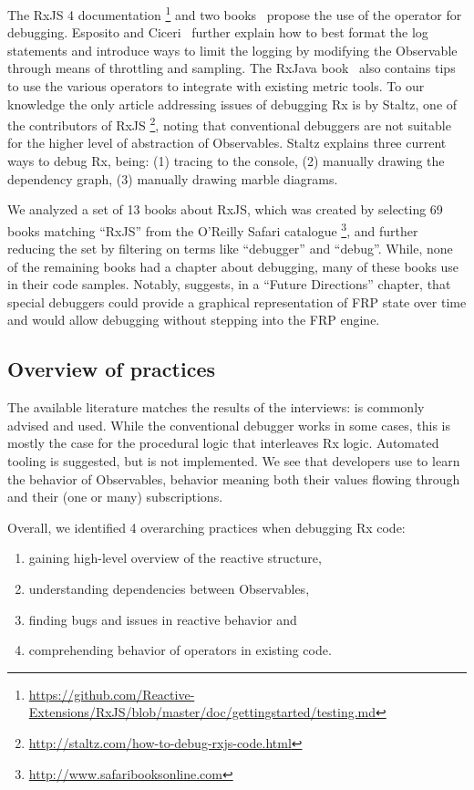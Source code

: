 The RxJS 4 documentation%
\footnote{ \url{https://github.com/Reactive-Extensions/RxJS/blob/master/doc/gettingstarted/testing.md}
} and two books~\cite{esposito2016reactive,rxjavabook2016} propose the
use of the  operator for debugging.  Esposito and Ciceri~\cite{esposito2016reactive}
further explain how to best format the log statements and introduce ways
to limit the logging by modifying the Observable through means of
throttling and sampling.  The RxJava book~\cite{rxjavabook2016} also
contains tips to use the various  operators to integrate with
existing metric tools.  To our knowledge the only article addressing
issues of debugging Rx is by Staltz, one of the contributors of RxJS%
\footnote{\url{http://staltz.com/how-to-debug-rxjs-code.html}}, noting
that conventional debuggers are not suitable for the higher level of
abstraction of Observables.  Staltz explains three current ways to debug
Rx, being:  (1) tracing to the console, (2) manually drawing the
dependency graph, (3) manually drawing marble diagrams.

We analyzed a set of 13 books about RxJS, which was created by selecting
69 books matching ``RxJS'' from the O'Reilly Safari catalogue%
\footnote{\url{http://www.safaribooksonline.com}}, and further reducing
the set by filtering on terms like ``debugger'' and ``debug''.  While,
none of the remaining books had a chapter about debugging, many of these
books use \printfdebugging{} in their code samples.  Notably,\cite{frpbook2016}
suggests, in a ``Future Directions'' chapter, that special debuggers
could provide a graphical representation of FRP state over time and
would allow debugging without stepping into the FRP engine.

\subsection{Overview of practices} The available literature matches the
results of the interviews:  \printfdebugging{} is commonly advised and
used.  While the conventional debugger works in some cases, this is
mostly the case for the procedural logic that interleaves Rx logic.
Automated tooling is suggested, but is not implemented.  We see that
developers use \printfdebugging{} to learn the behavior of Observables,
behavior meaning both their values flowing through and their (one or
many) subscriptions.

Overall, we identified 4 overarching practices when debugging Rx code:
\begin{enumerate}
        \itemsep0em
    \item[(1)]
        gaining high-level overview of the reactive structure,
    \item[(2)]
        understanding dependencies between Observables,
    \item[(3)]
        finding bugs and issues in reactive behavior and
    \item[(4)]
        comprehending behavior of operators in existing code.
\end{enumerate}
